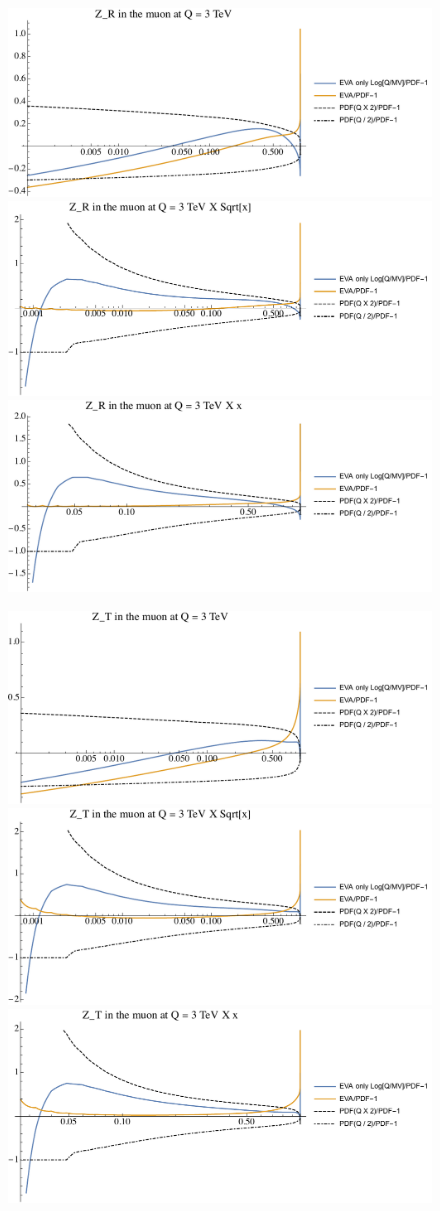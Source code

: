 \documentclass[a4paper,11pt]{article}
\begin{document}
\begin{figure}[ht]
\includegraphics[width=0.46\linewidth]{PlotPDFs/ratios/3TeV/Z_R_Q.pdf}
\includegraphics[width=0.46\linewidth]{PlotPDFs/ratios/3TeV/Z_R_Qsqrtx.pdf}
\includegraphics[width=0.46\linewidth]{PlotPDFs/ratios/3TeV/Z_R_Qx.pdf}
\end{figure}

\begin{figure}[ht]
\includegraphics[width=0.46\linewidth]{PlotPDFs/ratios/3TeV/Z_T_Q.pdf}
\includegraphics[width=0.46\linewidth]{PlotPDFs/ratios/3TeV/Z_T_Qsqrtx.pdf}
\includegraphics[width=0.46\linewidth]{PlotPDFs/ratios/3TeV/Z_T_Qx.pdf}
\end{figure}
\end{document}
